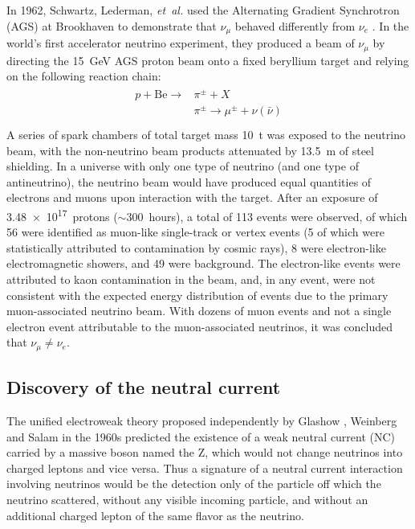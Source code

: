 In 1962, Schwartz, Lederman, \emph{et~al.} used the
Alternating Gradient Synchrotron (AGS) at Brookhaven
to demonstrate that $\nu_\mu$ behaved differently from $\nu_e$
\cite{numu_vs_nue}.
In the world's first accelerator neutrino experiment,
they produced a beam of $\nu_\mu$ by directing
the \SI{15}{\GeV} AGS proton beam
onto a fixed beryllium target and relying on the following reaction chain:
\begin{align}\label{eq:accel_reaction_chain}
    \begin{split}
        p + \text{Be} \to &\pi^{\pm} + X \\
        &\pi^{\pm} \to \mu^{\pm} + \nu(\bar{\nu}) \\
    \end{split}
\end{align}
A series of spark chambers of total target mass \SI{10}{\tonne}
was exposed to the neutrino beam,
with the non-neutrino beam products attenuated
by \SI{13.5}{\m} of steel shielding.
In a universe with only one type of neutrino (and one type of antineutrino),
the neutrino beam would have produced equal quantities
of electrons and muons upon interaction with the target.
After an exposure of \num{3.48e17}~protons (${\sim}300$~hours),
a total of 113 events were observed,
of which 56 were identified as muon-like single-track or vertex events
(5 of which were statistically attributed to contamination by cosmic rays),
8 were electron-like electromagnetic showers, and 49 were background.
The electron-like events were attributed to
kaon contamination in the beam,
and, in any event, were not consistent with the
expected energy distribution of events due to the
primary muon-associated neutrino beam.
With dozens of muon events and not a single electron event
attributable to the muon-associated neutrinos,
it was concluded that $\nu_\mu \neq \nu_e$.


\subsection{Discovery of the neutral current}
\label{subsec:neutral_current}

The unified electroweak theory proposed independently by
Glashow \cite{glashow}, Weinberg \cite{weinberg} and Salam \cite{salam}
in the 1960s
predicted the existence of a weak neutral current (NC)
carried by a massive boson named the Z,
which would not change neutrinos into charged leptons and vice versa.
Thus a signature of a neutral current interaction involving neutrinos
would be the detection only of the particle off which the neutrino scattered,
without any visible incoming particle,
and without an additional charged lepton of the same flavor as the neutrino.

